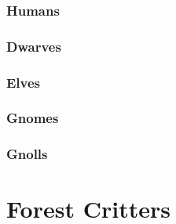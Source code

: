 \documentclass[a4paper,openany]{book}
\begin{document}
\begin{multicols}{2}

\subsection{Humans}

\humanfarmer

\humanmaid

\humansoldier

\humansoldier

\humandiplomat

\humanbard

\humanbard

\humanthief

\humanalchemist

\necromancer

\subsection{Dwarves}

\dwarvensoldier

\dwarventrader

\dwarvenrunemaster

\subsection{Elves}

\elf

\elf

\elvenenchanter

\subsection{Gnomes}

\gnome

\gnomishsoldier

\gnomishsoldier

\gnomishillusionist

\subsection{Gnolls}

\gnollhunter

\gnollshaman

\gnollshaman

\end{multicols}

\chapter{Forest Critters}
\end{document}
